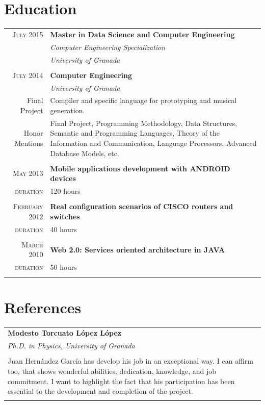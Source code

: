 \documentclass[a4paper,10pt]{article} %
\newcommand{\duration}{\textcolor{linkcolour}{\textsc{duration}}}
\newcommand{\fproject}{\textcolor{linkcolour}{Final Project}}
\newcommand{\hmentions}{\textcolor{linkcolour}{Honor Mentions}}
\begin{document}
\section{Education}

\begin{tabular}{r|p{11cm}}

\textsc{July 2015} & \textbf{Master in Data Science and Computer Engineering} \\
                   & \emph{Computer Engineering
Specialization}\\
& \emph{University of Granada} \\
\multicolumn{2}{c}{} \\

\textsc{July} 2014 & \textbf{Computer Engineering} \\
 & \emph{University of Granada}\\ 
 \fproject & Compiler and specific language for prototyping and musical
generation.\\ 
\hmentions & Final Project, Programming Methodology, Data Structures,
Semantic and Programming Languages, Theory of the Information and Communication, Language
Processors, Advanced Database Models, etc.\\
\multicolumn{2}{c}{} \\

\textsc{May} 2013 & \textbf{Mobile applications development with ANDROID
devices}\\
\duration & 120 hours \\
\multicolumn{2}{c}{} \\

\textsc{February} 2012 & \textbf{Real configuration scenarios of CISCO routers
and switches}\\
\duration & 40 hours \\
\multicolumn{2}{c}{} \\

\textsc{March} 2010 & \textbf{Web 2.0: Services oriented architecture in JAVA}\\
\duration & 50 hours\\
\multicolumn{2}{c}{} \\
\end{tabular}

\section{References}

\begin{tabular}{p{146mm}}

\textbf{Modesto Torcuato López López} \\
\emph{Ph.D. in Physics, University of Granada}\\ \\
Juan Hernández García has develop his job in an exceptional way. I can affirm
too, that shows wonderful abilities, dedication, knowledge, and job commitment.
I want to highlight the fact that his participation has been essential to the
development and completion of the project. \\
\multicolumn{1}{c}{}
\end{tabular}
\end{document}
